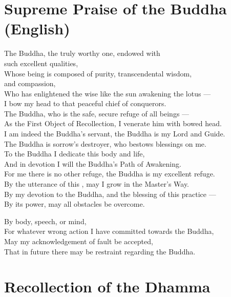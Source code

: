 \section*{Supreme Praise of the Buddha (English)}

\begin{leader}
\end{leader}

The Buddha, the truly worthy one, endowed with\\
\vin such excellent qualities,\\
Whose being is composed of purity, transcendental wisdom,\\
\vin and compassion,\\
Who has enlightened the wise like the sun awakening the lotus ---\\
I bow my head to that peaceful chief of conquerors.\\
The Buddha, who is the safe, secure refuge of all beings ---\\
As the First Object of Recollection, I venerate him with bowed head.\\
I am indeed the Buddha's servant, the Buddha is my Lord and Guide.\\
The Buddha is sorrow's destroyer, who bestows blessings on me.\\
To the Buddha I dedicate this body and life,\\
And in devotion I will  the Buddha's Path of Awakening.\\
For me there is no other refuge, the Buddha is my excellent refuge.\\
By the utterance of this , may I grow in the Master's Way.\\
By my devotion to the Buddha, and the blessing of this practice ---\\
By its power, may all obstacles be overcome.


By body, speech, or mind,\\
For whatever wrong action I have committed towards the Buddha,\\
May my acknowledgement of fault be accepted,\\
That in future there may be restraint regarding the Buddha.

\section*{Recollection of the Dhamma}

